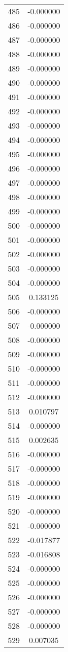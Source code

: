 \documentclass[12pt]{article}
\begin{document}
\begin{longtable}{@{}cc@{}}
485 & -0.000000 \\
486 & -0.000000 \\
487 & -0.000000 \\
488 & -0.000000 \\
489 & -0.000000 \\
490 & -0.000000 \\
491 & -0.000000 \\
492 & -0.000000 \\
493 & -0.000000 \\
494 & -0.000000 \\
495 & -0.000000 \\
496 & -0.000000 \\
497 & -0.000000 \\
498 & -0.000000 \\
499 & -0.000000 \\
500 & -0.000000 \\
501 & -0.000000 \\
502 & -0.000000 \\
503 & -0.000000 \\
504 & -0.000000 \\
505 & 0.133125 \\
506 & -0.000000 \\
507 & -0.000000 \\
508 & -0.000000 \\
509 & -0.000000 \\
510 & -0.000000 \\
511 & -0.000000 \\
512 & -0.000000 \\
513 & 0.010797 \\
514 & -0.000000 \\
515 & 0.002635 \\
516 & -0.000000 \\
517 & -0.000000 \\
518 & -0.000000 \\
519 & -0.000000 \\
520 & -0.000000 \\
521 & -0.000000 \\
522 & -0.017877 \\
523 & -0.016808 \\
524 & -0.000000 \\
525 & -0.000000 \\
526 & -0.000000 \\
527 & -0.000000 \\
528 & -0.000000 \\
529 & 0.007035 \\

\end{longtable}
\end{document}
